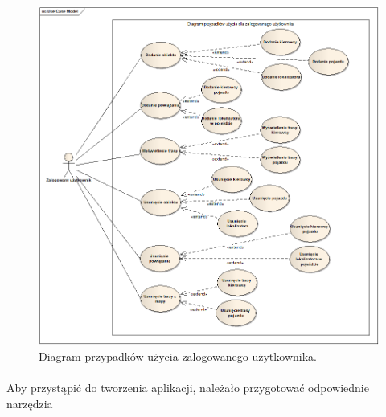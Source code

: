 \begin{figure}
\centering
\includegraphics[width=1\textwidth]{./graf/Przypadki_uzycia_zalogowany.png}
\caption{Diagram przypadków użycia zalogowanego użytkownika.}
\label{fig:2}
\end{figure}

\paragraph{}
Aby przystąpić do tworzenia aplikacji, należało przygotować odpowiednie narzędzia

